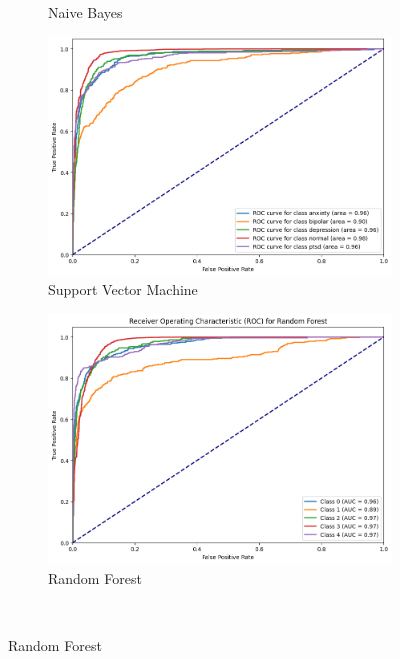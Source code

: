 \begin{figure}[H]
\begin{subfigure}[b]{0.49\textwidth}
        \caption{Naive Bayes}
        \label{NBROC}  %
    \end{subfigure}
    \hfill
    \begin{subfigure}[b]{0.49\textwidth}
        \centering
        \includegraphics[width=\textwidth]{Images/SVM ROC.png}
        \caption{Support Vector Machine}
        \label{SVMROC}  %
    \end{subfigure}
    \hfill
    \vspace{0.75cm}
    \begin{subfigure}[b]{0.49\textwidth}
        \centering
        \includegraphics[width=\textwidth]{Images/RF ROC.png}
        \caption{Random Forest}
        \label{RFROC}  %
    \end{subfigure}\

\end{figure}
